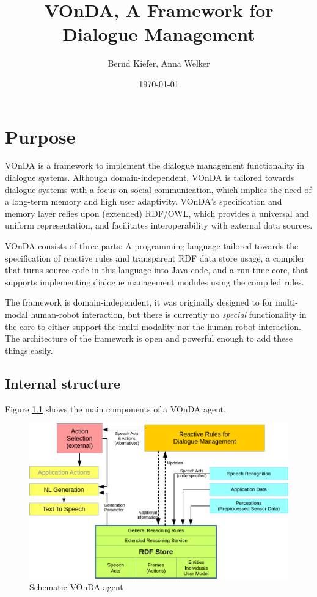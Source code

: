 \documentclass[a4paper]{report}
\newcommand{\vonda}{VOnDA\xspace}
\begin{document}
\title{\vonda, A Framework for Dialogue Management}

\author{Bernd Kiefer, Anna Welker}
\date{\today}

\maketitle

\tableofcontents

\chapter{Purpose}

\vonda is a framework to implement the dialogue management functionality in
dialogue systems. Although domain-independent, \vonda is tailored towards
dialogue systems with a focus on social communication, which implies the need
of a long-term memory and high user adaptivity. \vonda's specification and
memory layer relies upon (extended) RDF/OWL, which provides a universal and
uniform representation, and facilitates interoperability with external data
sources.


\vonda consists of three parts: A programming language tailored towards the
specification of reactive rules and transparent RDF data store usage, a
compiler that turns source code in this language into Java code, and a run-time
core, that supports implementing dialogue management modules using the compiled
rules.

The framework is domain-independent, it was originally designed to for
multi-modal human-robot interaction, but there is currently no \emph{special}
functionality in the core to either support the multi-modality nor the
human-robot interaction. The architecture of the framework is open and powerful
enough to add these things easily.


\section{Internal structure}

Figure \ref{fig:arch} shows the main components of a \vonda agent.


\begin{figure}[htb]
\includegraphics[width=.9\textwidth]{rudimant.png}
\caption{\label{fig:arch}Schematic \vonda agent}
\end{figure}
\end{document}
